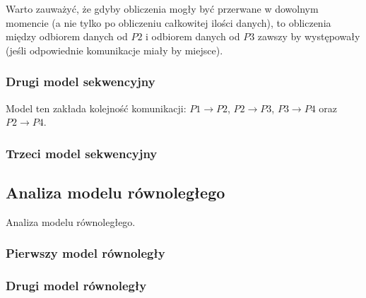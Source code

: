 \begin{description}
Warto zauważyć, że gdyby obliczenia mogły być przerwane w dowolnym momencie (a nie tylko po obliczeniu całkowitej ilości danych),
to obliczenia między odbiorem danych od $P2$ i odbiorem danych od $P3$ zawszy by występowały (jeśli odpowiednie komunikacje miały by miejsce).

\end{description}

\subsubsection{Drugi model sekwencyjny}

Model ten zakłada kolejność komunikacji: $P1 \to P2$, $P2 \to P3$, $P3 \to P4$ oraz $P2 \to P4$. \\

\subsubsection{Trzeci model sekwencyjny}

\subsection{Analiza modelu równoległego}

Analiza modelu równoległego.

\subsubsection{Pierwszy model równoległy}

\subsubsection{Drugi model równoległy}

